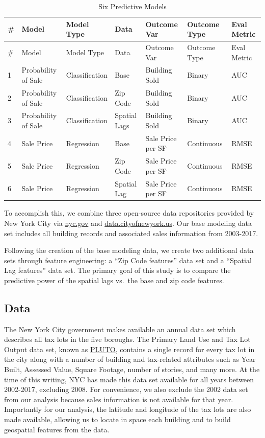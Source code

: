 \documentclass[]{article}
\begin{document}
\begin{longtable}[]{@{}lllllll@{}}
\caption{Six Predictive Models}\tabularnewline
\toprule
\# & Model & Model Type & Data & Outcome Var & Outcome Type & Eval
Metric\tabularnewline
\midrule
\endfirsthead
\toprule
\# & Model & Model Type & Data & Outcome Var & Outcome Type & Eval
Metric\tabularnewline
\midrule
\endhead
1 & Probability of Sale & Classification & Base & Building Sold & Binary
& AUC\tabularnewline
2 & Probability of Sale & Classification & Zip Code & Building Sold &
Binary & AUC\tabularnewline
3 & Probability of Sale & Classification & Spatial Lags & Building Sold
& Binary & AUC\tabularnewline
4 & Sale Price & Regression & Base & Sale Price per SF & Continuous &
RMSE\tabularnewline
5 & Sale Price & Regression & Zip Code & Sale Price per SF & Continuous
& RMSE\tabularnewline
6 & Sale Price & Regression & Spatial Lag & Sale Price per SF &
Continuous & RMSE\tabularnewline
\bottomrule
\end{longtable}

To accomplish this, we combine three open-source data repositories
provided by New York City via \url{nyc.gov} and
\url{data.cityofnewyork.us}. Our base modeling data set includes all
building records and associated sales information from 2003-2017.

Following the creation of the base modeling data, we create two
additional data sets through feature engineering: a ``Zip Code
features'' data set and a ``Spatial Lag features'' data set. The primary
goal of this study is to compare the predictive power of the spatial
lags vs.~the base and zip code features.

\subsection{Data}\label{data}

The New York City government makes available an annual data set which
describes all tax lots in the five boroughs. The Primary Land Use and
Tax Lot Output data set, known as
\href{https://www1.nyc.gov/site/planning/data-maps/open-data/bytes-archive.page?sorts\%5Byear\%5D=0}{PLUTO},
contains a single record for every tax lot in the city along with a
number of building and tax-related attributes such as Year Built,
Assessed Value, Square Footage, number of stories, and many more. At the
time of this writing, NYC has made this data set available for all years
between 2002-2017, excluding 2008. For convenience, we also exclude the
2002 data set from our analysis because sales information is not
available for that year. Importantly for our analysis, the latitude and
longitude of the tax lots are also made available, allowing us to locate
in space each building and to build geospatial features from the data.
\end{document}
